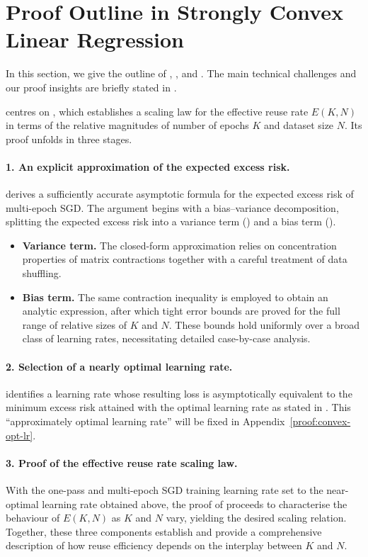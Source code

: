 \section{Proof Outline in Strongly Convex Linear Regression}\label{sec:convex-proof-outline}
In this section, we give the outline of , , and . The main technical challenges and our proof insights are briefly stated in .

 centres on , which establishes a scaling law for the effective reuse rate $E(K,N)$ in terms of the relative magnitudes of number of epochs $K$ and dataset size $N$. Its proof unfolds in three stages.

\paragraph{1. An explicit approximation of the expected excess risk.}  derives a sufficiently accurate asymptotic formula for the expected excess risk of multi-epoch SGD. The argument begins with a bias–variance decomposition, splitting the expected excess risk into a variance term () and a bias term ().
\begin{itemize}
    \item \textbf{Variance term.} The closed-form approximation relies on concentration properties of matrix contractions together with a careful treatment of data shuffling.
    \item \textbf{Bias term.} The same contraction inequality is employed to obtain an analytic expression, after which tight error bounds are proved for the full range of relative sizes of $K$ and $N$. These bounds hold uniformly over a broad class of learning rates, necessitating detailed case-by-case analysis.
\end{itemize}

\paragraph{2. Selection of a nearly optimal learning rate.}
 identifies a learning rate whose resulting loss is asymptotically equivalent to the minimum excess risk attained with the optimal learning rate as stated in . This ``approximately optimal learning rate'' will be fixed in Appendix~\ref{proof:convex-opt-lr}.

\paragraph{3. Proof of the effective reuse rate scaling law.} With the one-pass and multi-epoch SGD training learning rate set to the near-optimal learning rate obtained above, the proof of  proceeds to characterise the behaviour of $E(K,N)$ as $K$ and $N$ vary, yielding the desired scaling relation.
Together, these three components establish  and provide a comprehensive description of how reuse efficiency depends on the interplay between $K$ and $N$.